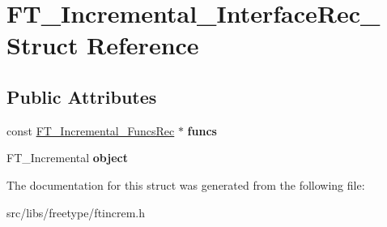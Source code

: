 \hypertarget{struct_f_t___incremental___interface_rec__}{
\section{FT\_\-Incremental\_\-InterfaceRec\_\- Struct Reference}
\label{struct_f_t___incremental___interface_rec__}
}
\subsection*{Public Attributes}
\begin{DoxyCompactItemize}
\item 
\hypertarget{struct_f_t___incremental___interface_rec___acd254ae2bdd80b4c9218a484c6bc2a41}{
const \hyperlink{struct_f_t___incremental___funcs_rec__}{FT\_\-Incremental\_\-FuncsRec} $\ast$ {\bfseries funcs}}
\label{struct_f_t___incremental___interface_rec___acd254ae2bdd80b4c9218a484c6bc2a41}

\item 
\hypertarget{struct_f_t___incremental___interface_rec___ae4f527f53465ff84ad01b484fe721a88}{
FT\_\-Incremental {\bfseries object}}
\label{struct_f_t___incremental___interface_rec___ae4f527f53465ff84ad01b484fe721a88}

\end{DoxyCompactItemize}


The documentation for this struct was generated from the following file:\begin{DoxyCompactItemize}
\item 
src/libs/freetype/ftincrem.h\end{DoxyCompactItemize}
